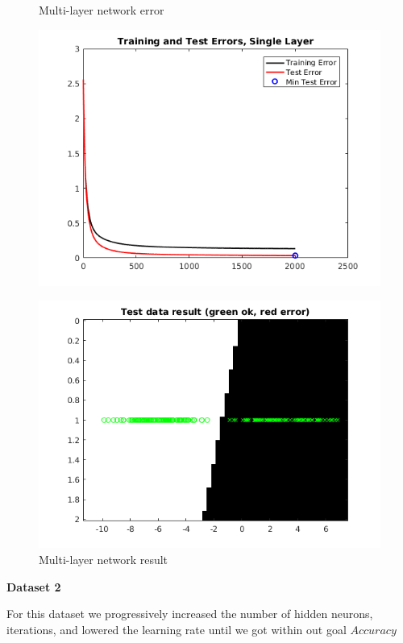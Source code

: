 \documentclass[a4paper,12pt]{article}
\begin{document}
\begin{figure}[H]
\centering
  \begin{minipage}[]{0.49\textwidth}
  \caption{Multi-layer network error}\label{fig:multi_1_error}
  \includegraphics[width=\textwidth]{figures/multi_1_error.png}
  \end{minipage}
  \begin{minipage}[]{0.49\textwidth}
  \caption{Multi-layer network result}\label{fig:multi_1_test}
  \includegraphics[width=\textwidth]{figures/multi_1_test.png}
  \end{minipage}
\end{figure}

\noindent \textbf{Dataset 2}

For this dataset we progressively increased the number of hidden neurons, iterations, and lowered the learning rate until we got within out goal $Accuracy$
\end{document}
